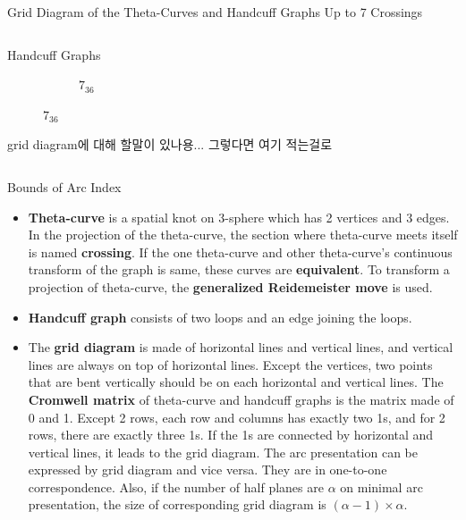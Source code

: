 \documentclass[final]{beamer}
\begin{document}
\begin{frame}[t]
\begin{alertblock}{Grid Diagram of the Theta-Curves and Handcuff Graphs Up to 7 Crossings}
\begin{columns}[t]
\begin{column}{0.5\textwidth}
\begin{alertblock}{Handcuff Graphs}
\begin{figure}
\begin{subfigure}{0.075\textwidth}
    \caption{$7_{36}$} 
    \end{subfigure}
  \end{figure}
  grid diagram에 대해 할말이 있나용... 그렇다면 여기 적는걸로
  \end{alertblock}
  \end{column}
  \end{columns}
  \end{alertblock}

\begin{columns}[t]
  \begin{block}{Bounds of Arc Index}
    \begin{itemize}
      \item \textbf{Theta-curve} is a spatial knot on 3-sphere which has 2 vertices and 3 edges.
      In the projection of the theta-curve, the section where theta-curve meets itself is named \textbf{crossing}.
      If the one theta-curve and other theta-curve's continuous transform of the graph is same, these curves are \textbf{equivalent}.
      To transform a projection of theta-curve, the \textbf{generalized Reidemeister move} is used.
      \item \textbf{Handcuff graph} consists of two loops and an edge joining the loops.
      \item The \textbf{grid diagram} is made of horizontal lines and vertical lines, and vertical lines are always on top of horizontal lines.
      Except the vertices, two points that are bent vertically should be on each horizontal and vertical lines.
      The \textbf{Cromwell matrix} of theta-curve and handcuff graphs is the matrix made of 0 and 1.
      Except 2 rows, each row and columns has exactly two 1s, and for 2 rows, there are exactly three 1s.
      If the 1s are connected by horizontal and vertical lines, it leads to the grid diagram.
      The arc presentation can be expressed by grid diagram and vice versa.
      They are in one-to-one correspondence.
      Also, if the number of half planes are $\alpha$ on minimal arc presentation, the size of corresponding grid diagram is $(\alpha - 1) \times \alpha$.\\


\end{itemize}
\end{block}
\end{columns}
\end{frame}
\end{document}
